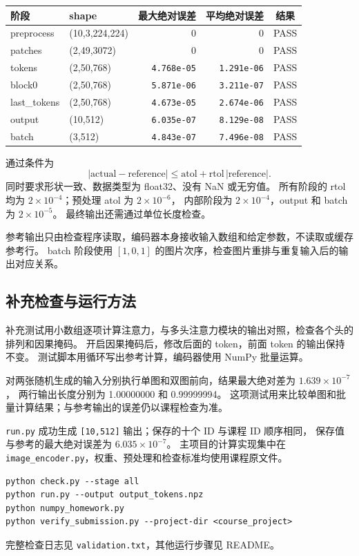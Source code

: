 \documentclass[a4paper,12pt]{article}
\newcommand{\shape}[1]{\texttt{#1}}
\newcommand{\file}[1]{\nolinkurl{#1}}
\begin{document}
\begin{center}
\small
\begin{tabular}{@{}l l r r c@{}}
\toprule
\textbf{阶段} & \textbf{shape} & \textbf{最大绝对误差} & \textbf{平均绝对误差} & \textbf{结果} \\
\midrule
preprocess & (10,3,224,224) & 0 & 0 & PASS \\
patches & (2,49,3072) & 0 & 0 & PASS \\
tokens & (2,50,768) & \texttt{4.768e-05} & \texttt{1.291e-06} & PASS \\
block0 & (2,50,768) & \texttt{5.871e-06} & \texttt{3.211e-07} & PASS \\
last\_tokens & (2,50,768) & \texttt{4.673e-05} & \texttt{2.674e-06} & PASS \\
output & (10,512) & \texttt{6.035e-07} & \texttt{8.129e-08} & PASS \\
batch & (3,512) & \texttt{4.843e-07} & \texttt{7.496e-08} & PASS \\
\bottomrule
\end{tabular}
\end{center}

通过条件为
\[
 |\mathrm{actual}-\mathrm{reference}|
 \leq \mathrm{atol}+\mathrm{rtol}\,|\mathrm{reference}|.
\]
同时要求形状一致、数据类型为 float32、没有 NaN 或无穷值。
所有阶段的 rtol 均为 $2\times10^{-4}$；预处理 atol 为 $2\times10^{-6}$，
内部阶段为 $2\times10^{-4}$，output 和 batch 为 $2\times10^{-5}$。
最终输出还需通过单位长度检查。

参考输出只由检查程序读取，编码器本身接收输入数组和给定参数，不读取或缓存参考行。
batch 阶段使用 $[1,0,1]$ 的图片次序，检查图片重排与重复输入后的输出对应关系。
\subsection{补充检查与运行方法}
补充测试用小数组逐项计算注意力，与多头注意力模块的输出对照，检查各个头的排列和因果掩码。
开启因果掩码后，修改后面的 token，前面 token 的输出保持不变。
测试脚本用循环写出参考计算，编码器使用 NumPy 批量运算。

对两张随机生成的输入分别执行单图和双图前向，结果最大绝对差为 $1.639\times10^{-7}$，
两行输出长度分别为 1.00000000 和 0.99999994。
这项测试用来比较单图和批量计算结果；与参考输出的误差仍以课程检查为准。

\file{run.py} 成功生成 \shape{[10,512]} 输出；保存的十个 ID 与课程 ID 顺序相同，
保存值与参考的最大绝对误差为 $6.035\times10^{-7}$。
主项目的计算实现集中在 \file{image_encoder.py}，权重、预处理和检查标准均使用课程原文件。
\begin{lstlisting}
python check.py --stage all
python run.py --output output_tokens.npz
python numpy_homework.py
python verify_submission.py --project-dir <course_project>
\end{lstlisting}
完整检查日志见 \file{validation.txt}，其他运行步骤见 README。
\end{document}
